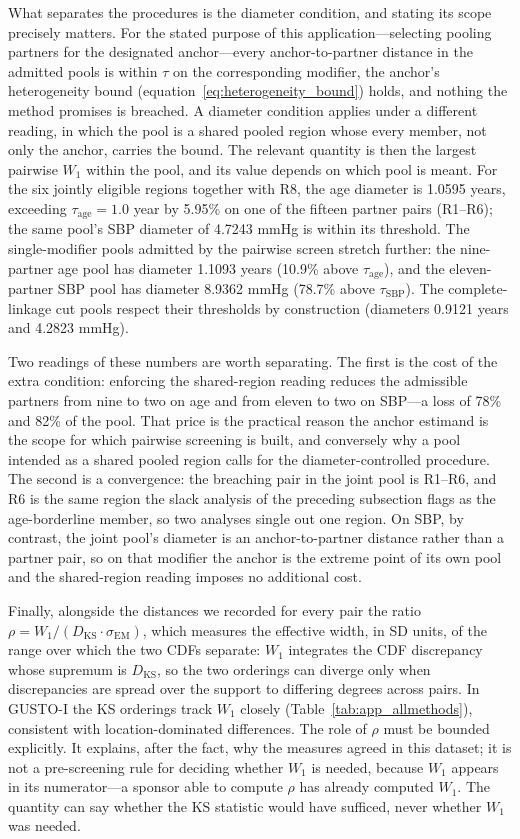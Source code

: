 \documentclass[AMA,Times1COL]{WileyNJDv5}
\begin{document}
What separates the procedures is the diameter condition, and stating its scope precisely matters. For the stated purpose of this application---selecting pooling partners for the designated anchor---every anchor-to-partner distance in the admitted pools is within $\tau$ on the corresponding modifier, the anchor's heterogeneity bound (equation~\ref{eq:heterogeneity_bound}) holds, and nothing the method promises is breached. A diameter condition applies under a different reading, in which the pool is a shared pooled region whose every member, not only the anchor, carries the bound. The relevant quantity is then the largest pairwise $W_1$ within the pool, and its value depends on which pool is meant. For the six jointly eligible regions together with R8, the age diameter is 1.0595 years, exceeding $\tau_{\text{age}} = 1.0$ year by 5.95\% on one of the fifteen partner pairs (R1--R6); the same pool's SBP diameter of 4.7243 mmHg is within its threshold. The single-modifier pools admitted by the pairwise screen stretch further: the nine-partner age pool has diameter 1.1093 years (10.9\% above $\tau_{\text{age}}$), and the eleven-partner SBP pool has diameter 8.9362 mmHg (78.7\% above $\tau_{\text{SBP}}$). The complete-linkage cut pools respect their thresholds by construction (diameters 0.9121 years and 4.2823 mmHg).

Two readings of these numbers are worth separating. The first is the cost of the extra condition: enforcing the shared-region reading reduces the admissible partners from nine to two on age and from eleven to two on SBP---a loss of 78\% and 82\% of the pool. That price is the practical reason the anchor estimand is the scope for which pairwise screening is built, and conversely why a pool intended as a shared pooled region calls for the diameter-controlled procedure. The second is a convergence: the breaching pair in the joint pool is R1--R6, and R6 is the same region the slack analysis of the preceding subsection flags as the age-borderline member, so two analyses single out one region. On SBP, by contrast, the joint pool's diameter is an anchor-to-partner distance rather than a partner pair, so on that modifier the anchor is the extreme point of its own pool and the shared-region reading imposes no additional cost.

Finally, alongside the distances we recorded for every pair the ratio $\rho = W_1 / (D_{\text{KS}} \cdot \sigma_{\text{EM}})$, which measures the effective width, in SD units, of the range over which the two CDFs separate: $W_1$ integrates the CDF discrepancy whose supremum is $D_{\text{KS}}$, so the two orderings can diverge only when discrepancies are spread over the support to differing degrees across pairs. In GUSTO-I the KS orderings track $W_1$ closely (Table~\ref{tab:app_allmethods}), consistent with location-dominated differences. The role of $\rho$ must be bounded explicitly. It explains, after the fact, why the measures agreed in this dataset; it is not a pre-screening rule for deciding whether $W_1$ is needed, because $W_1$ appears in its numerator---a sponsor able to compute $\rho$ has already computed $W_1$. The quantity can say whether the KS statistic would have sufficed, never whether $W_1$ was needed.
\end{document}
